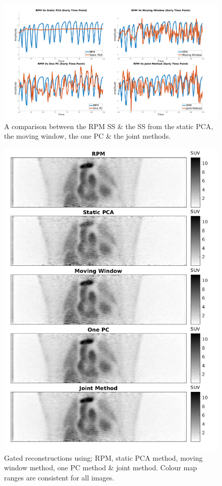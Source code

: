     \begin{figure}
        \vspace{-0.0cm}
        \centering
        \includegraphics[width=1.0\linewidth]{figures/surrogate_signal.png}
        \captionsetup{singlelinecheck=false, justification=centering}
        \caption{A comparison between the \gls{RPM} \gls{SS} \& the \gls{SS} from the static \gls{PCA}, the moving window, the one \gls{PC} \& the joint methods.}
        \label{fig:surrogate_signal}
        \vspace{-0.5cm}
    \end{figure}
    
    \begin{figure}
        \vspace{-0.5cm}
        \centering
        \includegraphics[width=0.75\linewidth]{figures/visual_analysis_pca.png}
        \captionsetup{singlelinecheck=false, justification=centering}
        \caption{Gated reconstructions using; \gls{RPM}, static \gls{PCA} method, moving window method, one \gls{PC} method \& joint method. Colour map ranges are consistent for all images.}
        \label{fig:visual_analysis}
        \vspace{-0.5cm}
    \end{figure}
    
